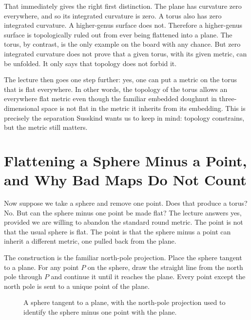 That immediately gives the right first distinction. The plane has curvature zero everywhere, and so its integrated curvature is zero. A torus also has zero integrated curvature. A higher-genus surface does not. Therefore a higher-genus surface is topologically ruled out from ever being flattened into a plane. The torus, by contrast, is the only example on the board with any chance. But zero integrated curvature does not prove that a given torus, with its given metric, can be unfolded. It only says that topology does not forbid it.

The lecture then goes one step further: yes, one can put a metric on the torus that is flat everywhere. In other words, the topology of the torus allows an everywhere flat metric even though the familiar embedded doughnut in three-dimensional space is not flat in the metric it inherits from its embedding. This is precisely the separation Susskind wants us to keep in mind: topology constrains, but the metric still matters.

\section{Flattening a Sphere Minus a Point, and Why Bad Maps Do Not Count}

Now suppose we take a sphere and remove one point. Does that produce a torus? No. But can the sphere minus one point be made flat? The lecture answers yes, provided we are willing to abandon the standard round metric. The point is not that the usual sphere is flat. The point is that the sphere minus a point can inherit a different metric, one pulled back from the plane.

The construction is the familiar north-pole projection. Place the sphere tangent to a plane. For any point \(P\) on the sphere, draw the straight line from the north pole through \(P\) and continue it until it reaches the plane. Every point except the north pole is sent to a unique point of the plane.

\begin{figure}[t]
\centering
{}
\caption{A sphere tangent to a plane, with the north-pole projection used to identify the sphere minus one point with the plane.}
\end{figure}


